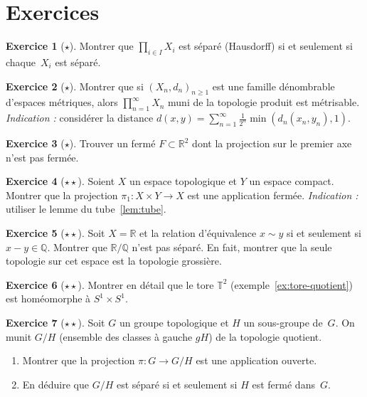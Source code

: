 \documentclass[12pt,a4paper,openany]{book}
\theoremstyle{definition}
\theoremstyle{cours}
\theoremstyle{coursnormal}
\newtheorem{exercice}{Exercice}[chapter]
\begin{document}
\section{Exercices}
\label{sec:exo-produit-quotient}

\begin{exercice}[$\star$]
\label{exo:produit-hausdorff}
Montrer que $\prod_{i \in I} X_i$ est séparé (Hausdorff) si et seulement si
chaque~$X_i$ est séparé.
\end{exercice}

\begin{exercice}[$\star$]
\label{exo:produit-denombrable-metrisable}
Montrer que si $(X_n, d_n)_{n \geqslant 1}$ est une famille dénombrable d'espaces
métriques, alors $\prod_{n=1}^{\infty} X_n$ muni de la topologie produit est
métrisable. \emph{Indication :} considérer la distance
$d(x,y) = \sum_{n=1}^{\infty} \frac{1}{2^n} \min(d_n(x_n, y_n), 1)$.
\end{exercice}

\begin{exercice}[$\star$]
\label{exo:projection-non-fermee}
Trouver un fermé $F \subset \mathbb{R}^2$ dont la projection sur le premier axe
n'est pas fermée.
\end{exercice}

\begin{exercice}[$\star\star$]
\label{exo:tube-lemme-application}
Soient $X$ un espace topologique et $Y$ un espace compact. Montrer que la
projection $\pi_1 \colon X \times Y \to X$ est une application fermée.
\emph{Indication :} utiliser le lemme du tube~\ref{lem:tube}.
\end{exercice}

\begin{exercice}[$\star\star$]
\label{exo:quotient-non-hausdorff}
Soit $X = \mathbb{R}$ et la relation d'équivalence $x \sim y$ si et seulement si
$x - y \in \mathbb{Q}$. Montrer que $\mathbb{R}/\mathbb{Q}$ n'est pas séparé.
En fait, montrer que la seule topologie sur cet espace est la topologie grossière.
\end{exercice}

\begin{exercice}[$\star\star$]
\label{exo:tore-produit}
Montrer en détail que le tore $\mathbb{T}^2$ (exemple~\ref{ex:tore-quotient})
est homéomorphe à $S^1 \times S^1$.
\end{exercice}

\begin{exercice}[$\star\star$]
\label{exo:quotient-ouvert}
Soit $G$ un groupe topologique et $H$ un sous-groupe de~$G$. On munit $G/H$
(ensemble des classes à gauche $gH$) de la topologie quotient.
\begin{enumerate}[label=(\alph*)]
  \item Montrer que la projection $\pi \colon G \to G/H$ est une application ouverte.
  \item En déduire que $G/H$ est séparé si et seulement si $H$ est fermé dans~$G$.
\end{enumerate}
\end{exercice}
\end{document}
